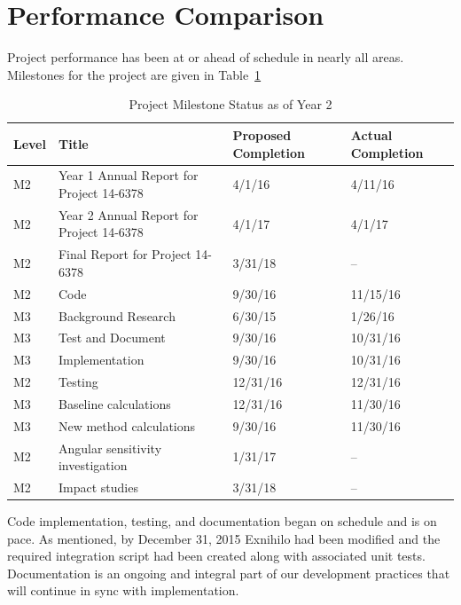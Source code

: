 \documentclass[12pt]{article}
\newcommand{\yr}{2}
\begin{document}
\section{Performance Comparison}
\label{sect::perf-comp} 
Project performance has been at or ahead of schedule in nearly all areas. 
Milestones for the project are given in Table~\ref{tab:milestones}
\begin{table}[h!]
\begin{center}
\caption{Project Milestone Status as of Year \yr}
\begin{tabular}{ | l | l | l | l | }
\hline
\textbf{Level} & \textbf{Title} & \textbf{Proposed Completion} & \textbf{Actual Completion} \\ \hline
M2 & Year 1 Annual Report for Project 14-6378 & 4/1/16 & 4/11/16 \\
M2 & Year 2 Annual Report for Project 14-6378 & 4/1/17 & 4/1/17 \\ 
M2 & Final Report for Project 14-6378 & 3/31/18 & -- \\ \hline
M2 & Code & 9/30/16 & 11/15/16 \\
M3 & Background Research & 6/30/15 & 1/26/16 \\
M3 & Test and Document & 9/30/16 & 10/31/16 \\
M3 & Implementation & 9/30/16 & 10/31/16 \\  \hline
M2 & Testing & 12/31/16 & 12/31/16 \\
M3 & Baseline calculations & 12/31/16 & 11/30/16 \\
M3 & New method calculations & 9/30/16 & 11/30/16 \\ \hline
M2 & Angular sensitivity investigation & 1/31/17 & -- \\ \hline
M2 & Impact studies & 3/31/18 & -- \\
\hline
\end{tabular}
\label{tab:milestones}
\end{center}
\end{table}

Code implementation, testing, and documentation began on schedule and is on pace. 
As mentioned, by December 31, 2015 Exnihilo had been modified and the required integration script had been created along with associated unit tests. 
Documentation is an ongoing and integral part of our development practices that will continue in sync with implementation. 
\end{document}
